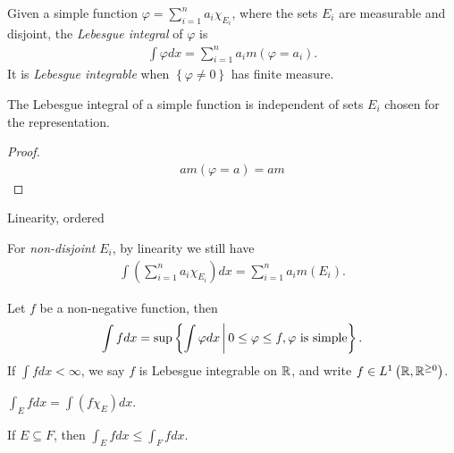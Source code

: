 \begin{defn}
    Given a simple function $\varphi = \sum_{i=1}^{n}a_i\chi_{E_i}$, where the sets $E_i$ are measurable and disjoint, the \emph{Lebesgue integral} of $\varphi$ is
    \begin{align*}
        \int\varphi dx = \sum_{i=1}^{n}a_i m\left(\varphi=a_i\right).
    \end{align*}
    It is \emph{Lebesgue integrable} when $\left\{\varphi \neq 0\right\}$ has finite measure.
\end{defn}

\begin{lemma}
    The Lebesgue integral of a simple function is independent of sets $E_i$ chosen for the representation.
\end{lemma}

\begin{proof}
    \begin{align*}
        a m\left(\varphi=a\right) = am
    \end{align*}
\end{proof}

\begin{defn}
    Linearity, ordered
\end{defn}

\begin{cor}
    For \emph{non-disjoint} $E_i$, by linearity we still have
    \begin{align*}
        \int\left(\sum_{i=1}^{n}a_i\chi_{E_i}\right)dx = \sum_{i=1}^{n}a_i m\left(E_i\right).
    \end{align*}
\end{cor}

\begin{defn}
    Let $f$ be a non-negative function, then
    \begin{align*}
        \int fdx = \sup\left\{\int\varphi dx \,\middle|\, 0 \leq \varphi \leq f, \varphi \textrm{ is simple}\right\}.
    \end{align*}
    If $\int fdx < \infty$, we say $f$ is Lebesgue integrable on $\mathbb{R}$, and write $f \in L^{1}\left(\mathbb{R}, \mathbb{R}^{\geq 0}\right)$.
\end{defn}

\begin{defn}
    $\int_{E}fdx = \int\left(f\chi_{E}\right)dx$.
\end{defn}

\begin{lemma}
    If $E \subseteq F$, then $\int_{E}fdx \leq \int_{F}fdx$.
\end{lemma}

